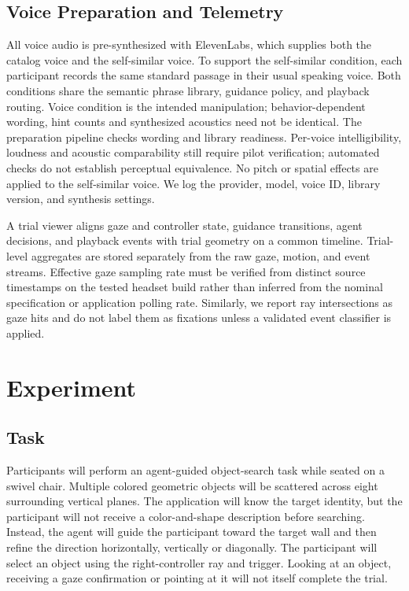 \documentclass[11pt,letterpaper]{article}
\begin{document}
\subsection{Voice Preparation and Telemetry}
All voice audio is pre-synthesized with ElevenLabs, which supplies both the catalog voice and the self-similar voice. To support the self-similar condition, each participant records the same standard passage in their usual speaking voice. Both conditions share the semantic phrase library, guidance policy, and playback routing. Voice condition is the intended manipulation; behavior-dependent wording, hint counts and synthesized acoustics need not be identical. The preparation pipeline checks wording and library readiness. Per-voice intelligibility, loudness and acoustic comparability still require pilot verification; automated checks do not establish perceptual equivalence. No pitch or spatial effects are applied to the self-similar voice. We log the provider, model, voice ID, library version, and synthesis settings.

A trial viewer aligns gaze and controller state, guidance transitions, agent decisions, and playback events with trial geometry on a common timeline. Trial-level aggregates are stored separately from the raw gaze, motion, and event streams. Effective gaze sampling rate must be verified from distinct source timestamps on the tested headset build rather than inferred from the nominal specification or application polling rate. Similarly, we report ray intersections as gaze hits and do not label them as fixations unless a validated event classifier is applied.
\section{Experiment}
\subsection{Task}
Participants will perform an agent-guided object-search task while seated on a swivel chair. Multiple colored geometric objects will be scattered across eight surrounding vertical planes. The application will know the target identity, but the participant will not receive a color-and-shape description before searching. Instead, the agent will guide the participant toward the target wall and then refine the direction horizontally, vertically or diagonally. The participant will select an object using the right-controller ray and trigger. Looking at an object, receiving a gaze confirmation or pointing at it will not itself complete the trial.
\end{document}
